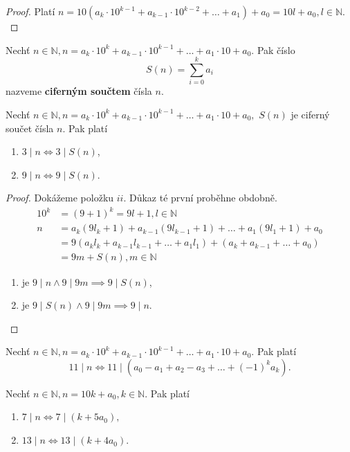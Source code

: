 \begin{proof}
Platí $n = 10(a_k\cdot 10^{k-1}+a_{k-1}\cdot 10 ^{k-2}+\dots+a_1)+a_0 = 10l+a_0, l\in \mathbb N.$
\end{proof}

\begin{definition}
  Nechť $n\in \mathbb N, n=a_k\cdot 10^k+a_{k-1}\cdot 10^{k-1}+\dots + a_1\cdot 10 + a_0.$ Pak číslo
  $$S(n) = \sum_{i=0}^k a_i$$
  nazveme \textbf{ciferným součtem} čísla $n$.
\end{definition}

\begin{veta}
  Nechť $n\in \mathbb N, n=a_k\cdot 10^k+a_{k-1}\cdot 10^{k-1}+\dots + a_1\cdot 10 + a_0,$ $S(n)$ je ciferný součet čísla $n$. Pak platí
  \begin{enumerate}[$i.$]
    \item $3\mid n \iff 3 \mid S(n)$,
    \item $9\mid n \iff 9 \mid S(n)$.
  \end{enumerate}
\end{veta}

\begin{proof}
  Dokážeme položku $ii$. Důkaz té první proběhne obdobně.
  \begin{align*}
    10^k & = (9+1)^k = 9l+1, l \in \mathbb N \\
    n & = a_k(9l_k+1)+a_{k-1}(9l_{k-1}+1)+\dots + a_1(9l_1+1)+a_0 \\
      & = 9(a_kl_k+a_{k-1}l_{k-1}+\dots+a_1l_1)+(a_k+a_{k-1}+\dots+a_0) \\
      & = 9m+S(n), m \in \mathbb N
  \end{align*}
  \begin{enumerate}
    \item[$\implies$] je $9 \mid n \land 9 \mid 9m \implies 9 \mid S(n)$,
    \item[$\impliedby$] je $9 \mid S(n) \land 9 \mid 9m \implies 9 \mid n.$ \qedhere
  \end{enumerate}
\end{proof}

\begin{veta}
  Nechť $n\in \mathbb N, n=a_k\cdot 10^k + a_{k-1}\cdot 10^{k-1}+\dots+a_1\cdot 10+ a_0$. Pak platí
  \[
    11 \mid n \iff 11 \mid (a_0-a_1+a_2-a_3+\dots+(-1)^k a_k).
  \]
\end{veta}

\begin{veta}
  Nechť $n\in \mathbb N, n=10k+a_0,k\in \mathbb N.$ Pak platí
  \begin{enumerate}[$i.$]
    \item $7 \mid n \iff 7 \mid (k+5a_0),$
    \item $13 \mid n \iff 13 \mid (k+4a_0) $.
  \end{enumerate}
\end{veta}

